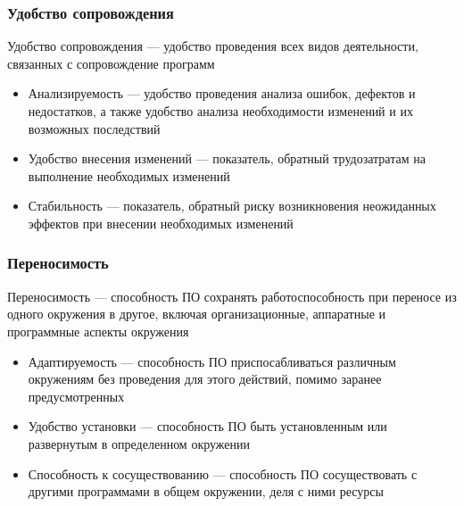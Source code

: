 \documentclass{../industrial-development}
\begin{document}
\begin{frame} \frametitle {Удобство сопровождения}
	\begin{block}{}
		\alert{Удобство сопровождения} --- удобство проведения всех видов деятельности, связанных с сопровождение программ
	\end{block}
	\begin{itemize}
		\item Анализируемость --- удобство проведения анализа ошибок, дефектов и недостатков, а также удобство анализа необходимости изменений и их возможных последствий
	\end{itemize}
	\begin{itemize}
		\item Удобство внесения изменений --- показатель, обратный трудозатратам на выполнение необходимых изменений
	\end{itemize}
	\begin{itemize}
	\item Стабильность --- показатель, обратный риску возникновения неожиданных эффектов при внесении необходимых изменений
\end{itemize}
\end{frame}	

\begin{frame} \frametitle {Переносимость}
\begin{block}{}
	\alert{Переносимость} --- способность ПО сохранять работоспособность при переносе из одного окружения в другое, включая организационные, аппаратные и программные аспекты окружения	
\end{block}
	\begin{itemize}
		\item Адаптируемость --- способность ПО приспосабливаться различным окружениям без проведения для этого действий, помимо заранее предусмотренных
	\end{itemize}
	\begin{itemize}
		\item Удобство установки --- способность ПО быть установленным или развернутым в определенном окружении
	\end{itemize}
	\begin{itemize}
		\item Способность к сосуществованию --- способность ПО сосуществовать с другими программами в общем окружении, деля с ними ресурсы
	\end{itemize}
\end{frame}	
\end{document}
